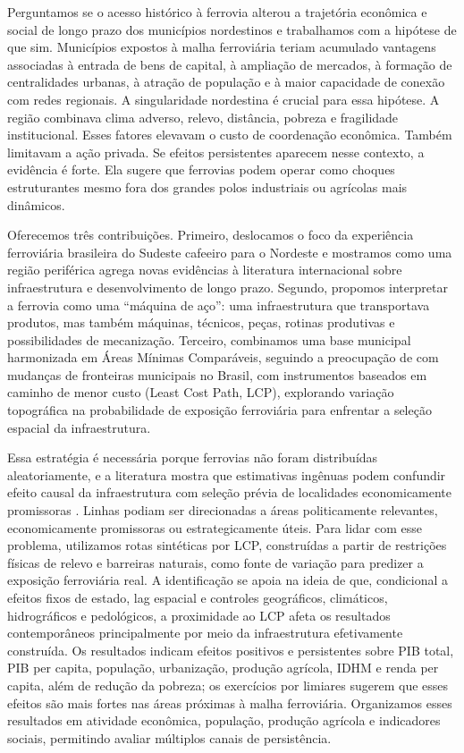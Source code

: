 \documentclass[12pt,a4paper]{article}
\begin{document}
Perguntamos se o acesso histórico à ferrovia alterou a trajetória econômica e social de longo prazo dos municípios nordestinos e trabalhamos com a hipótese de que sim. Municípios expostos à malha ferroviária teriam acumulado vantagens associadas à entrada de bens de capital, à ampliação de mercados, à formação de centralidades urbanas, à atração de população e à maior capacidade de conexão com redes regionais. A singularidade nordestina é crucial para essa hipótese. A região combinava clima adverso, relevo, distância, pobreza e fragilidade institucional. Esses fatores elevavam o custo de coordenação econômica. Também limitavam a ação privada. Se efeitos persistentes aparecem nesse contexto, a evidência é forte. Ela sugere que ferrovias podem operar como choques estruturantes mesmo fora dos grandes polos industriais ou agrícolas mais dinâmicos.

Oferecemos três contribuições. Primeiro, deslocamos o foco da experiência ferroviária brasileira do Sudeste cafeeiro para o Nordeste e mostramos como uma região periférica agrega novas evidências à literatura internacional sobre infraestrutura e desenvolvimento de longo prazo. Segundo, propomos interpretar a ferrovia como uma ``máquina de aço'': uma infraestrutura que transportava produtos, mas também máquinas, técnicos, peças, rotinas produtivas e possibilidades de mecanização. Terceiro, combinamos uma base municipal harmonizada em Áreas Mínimas Comparáveis, seguindo a preocupação de \citet{ehrl2017} com mudanças de fronteiras municipais no Brasil, com instrumentos baseados em caminho de menor custo (Least Cost Path, LCP), explorando variação topográfica na probabilidade de exposição ferroviária para enfrentar a seleção espacial da infraestrutura.

Essa estratégia é necessária porque ferrovias não foram distribuídas aleatoriamente, e a literatura mostra que estimativas ingênuas podem confundir efeito causal da infraestrutura com seleção prévia de localidades economicamente promissoras \citep{banerjee2012,donaldson2018,berger2017,jedwab2016}. Linhas podiam ser direcionadas a áreas politicamente relevantes, economicamente promissoras ou estrategicamente úteis. Para lidar com esse problema, utilizamos rotas sintéticas por LCP, construídas a partir de restrições físicas de relevo e barreiras naturais, como fonte de variação para predizer a exposição ferroviária real. A identificação se apoia na ideia de que, condicional a efeitos fixos de estado, lag espacial e controles geográficos, climáticos, hidrográficos e pedológicos, a proximidade ao LCP afeta os resultados contemporâneos principalmente por meio da infraestrutura efetivamente construída. Os resultados indicam efeitos positivos e persistentes sobre PIB total, PIB per capita, população, urbanização, produção agrícola, IDHM e renda per capita, além de redução da pobreza; os exercícios por limiares sugerem que esses efeitos são mais fortes nas áreas próximas à malha ferroviária. Organizamos esses resultados em atividade econômica, população, produção agrícola e indicadores sociais, permitindo avaliar múltiplos canais de persistência.
\end{document}
